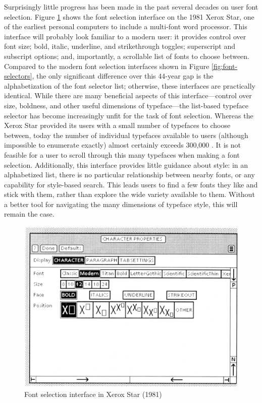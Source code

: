 Surprisingly little progress has been made in the past several decades on user font selection. Figure \ref{fig:xerox-star} shows the font selection interface on the 1981 Xerox Star, one of the earliest personal computers to include a multi-font word processor. This interface will probably look familiar to a modern user: it provides control over font size; bold, italic, underline, and strikethrough toggles; superscript and subscript options; and, importantly, a scrollable list of fonts to choose between. Compared to the modern font selection interfaces shown in Figure \ref{fig:font-selectors}, the only significant difference over this 44-year gap is the alphabetization of the font selector list; otherwise, these interfaces are practically identical. While there are many beneficial aspects of this interface---control over size, boldness, and other useful dimensions of typeface---the list-based typeface selector has become increasingly unfit for the task of font selection. Whereas the Xerox Star provided its users with a small number of typefaces to choose between, today the number of individual typefaces available to users (although impossible to enumerate exactly) almost certainly exceeds 300,000 \cite{cheng2006}. It is not feasible for a user to scroll through this many typefaces when making a font selection. Additionally, this interface provides little guidance about style: in an alphabetized list, there is no particular relationship between nearby fonts, or any capability for style-based search. This leads users to find a few fonts they like and stick with them, rather than explore the wide variety available to them. Without a better tool for navigating the many dimensions of typeface style, this will remain the case.

\begin{figure}
    \centering
    \includegraphics[width=.8\textwidth]{images/xerox-star.png}
    \caption{Font selection interface in Xerox Star (1981)}
    \label{fig:xerox-star}
\end{figure}

